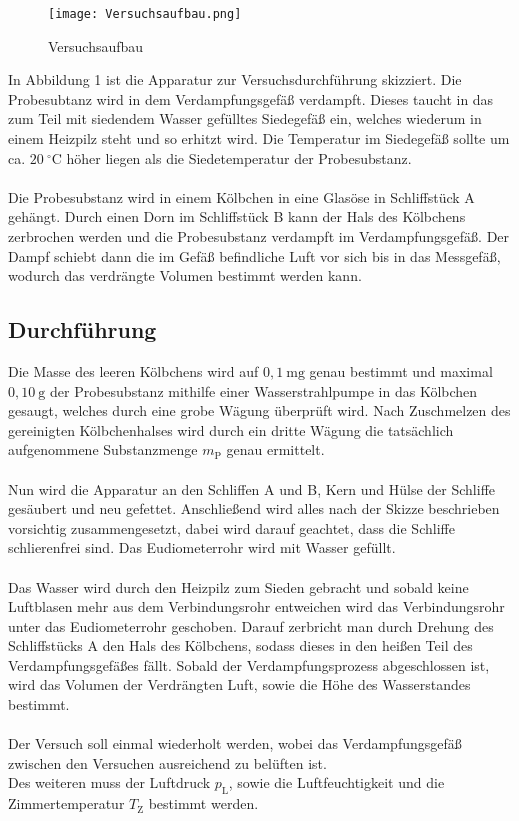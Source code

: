 \documentclass[12pt,a4paper,titlepage,headinclude,bibtotoc]{scrartcl}
\begin{document}
\begin{figure} [h!]
\begin{center}
\texttt{[image: Versuchsaufbau.png]} 
\end{center}
\caption {Versuchsaufbau}
\end{figure}


In Abbildung 1 ist die Apparatur zur Versuchsdurchführung skizziert. Die Probesubtanz wird in dem Verdampfungsgefäß verdampft. Dieses taucht in das zum Teil mit siedendem Wasser gefülltes Siedegefäß ein, welches wiederum in einem Heizpilz steht und so erhitzt wird. Die Temperatur im Siedegefäß sollte um ca. $20{~} ^{\circ}$C höher liegen als die Siedetemperatur der Probesubstanz. \\\\
Die Probesubstanz wird in einem Kölbchen in eine Glasöse in Schliffstück A gehängt. Durch einen Dorn im Schliffstück B kann der Hals des Kölbchens zerbrochen werden und die Probesubstanz verdampft im Verdampfungsgefäß. Der Dampf schiebt dann die im Gefäß befindliche Luft vor sich bis in das Messgefäß, wodurch das verdrängte Volumen bestimmt werden kann.

\subsection{Durchführung}
Die Masse des leeren Kölbchens wird auf $0,1 {~} \mathrm{mg}$ genau bestimmt und maximal $0,10{~}\mathrm{g}$ der Probesubstanz mithilfe einer Wasserstrahlpumpe in das Kölbchen gesaugt, welches durch eine grobe Wägung überprüft wird. Nach Zuschmelzen des gereinigten Kölbchenhalses wird durch ein dritte Wägung die tatsächlich aufgenommene Substanzmenge $m_{\mathrm{P}}$ genau ermittelt.\\\\
Nun wird die Apparatur an den Schliffen A und B, Kern und Hülse der Schliffe gesäubert und neu gefettet. Anschließend wird alles nach der Skizze beschrieben vorsichtig zusammengesetzt, dabei wird darauf geachtet, dass die Schliffe schlierenfrei sind. Das Eudiometerrohr wird mit Wasser gefüllt.\\\\
Das Wasser wird durch den Heizpilz zum Sieden gebracht und sobald keine Luftblasen mehr aus dem Verbindungsrohr entweichen wird das Verbindungsrohr unter das Eudiometerrohr geschoben. Darauf zerbricht man durch Drehung des Schliffstücks A den Hals des Kölbchens, sodass dieses in den heißen Teil des Verdampfungsgefäßes fällt. Sobald der Verdampfungsprozess abgeschlossen ist, wird das Volumen der Verdrängten Luft, sowie die Höhe des Wasserstandes bestimmt.\\\\
Der Versuch soll einmal wiederholt werden, wobei das Verdampfungsgefäß zwischen den Versuchen ausreichend zu belüften ist.\\
Des weiteren muss der Luftdruck $p_\mathrm{L}$, sowie die Luftfeuchtigkeit und die Zimmertemperatur $T_{\mathrm{Z}}$ bestimmt werden.     
\end{document}
